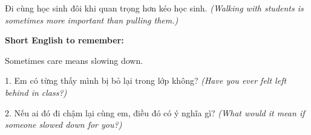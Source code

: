 \begin{baihoc}
Đi cùng học sinh đôi khi quan trọng hơn kéo học sinh.
\textit{(Walking with students is sometimes more important than pulling them.)}
\end{baihoc}

\begin{ghinhoanh}
\textbf{Short English to remember:}

Sometimes care means slowing down.

\end{ghinhoanh}

\begin{tuhocnhanh}
1. Em có từng thấy mình bị bỏ lại trong lớp không? \textit{(Have you ever felt left behind in class?)}

2. Nếu ai đó đi chậm lại cùng em, điều đó có ý nghĩa gì? \textit{(What would it mean if someone slowed down for you?)}
\end{tuhocnhanh}
\ngancach
